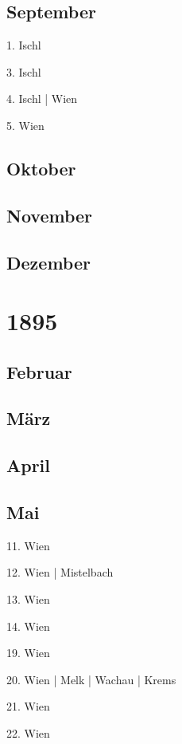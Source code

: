 \documentclass[twoside=false,titlepage=false,open=any, parskip=never, fontsize=10pt, headings=small, chapterprefix=false, appendixprefix=false, DIV=15]{scrbook}
\begin{document}
\begin{multicols}{3}
            \section*{September}
            1. Ischl\par
            3. Ischl\par
            4. Ischl | Wien\par
            5. Wien\par
            \section*{Oktober}
            \section*{November}
            \section*{Dezember}
            \chapter*{1895}
            \section*{Februar}
            \section*{März}
            \section*{April}
            \section*{Mai}
            11. Wien\par
            12. Wien | Mistelbach\par
            13. Wien\par
            14. Wien\par
            19. Wien\par
            20. Wien | Melk | Wachau | Krems\par
            21. Wien\par
            22. Wien\par

\end{multicols}
\end{document}
